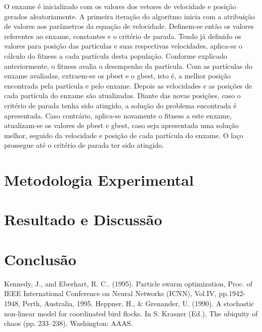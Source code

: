 \documentclass[conference]{IEEEtran}
\begin{document}
	O enxame é inicializado com os valores dos vetores de velocidade e posição gerados aleatoriamente. A primeira iteração do algoritmo inicia com a atribuição de valores aos parâmetros da equação de velocidade. Definem-se então os valores referentes ao enxame, constantes e o critério de parada. Tendo já definido os valores para posição das partículas e suas respectivas velocidades, aplica-se o cálculo do fitness a cada partícula desta população. Conforme explicado anteriormente, o fitness avalia o desempenho da partícula. Com as partículas do enxame avaliadas, extraem-se os pbest e o gbest, isto é, a melhor posição encontrada pela partícula e pelo enxame. Depois as velocidades e as posições de cada partícula do enxame são atualizadas. Diante das novas posições, caso o critério de parada tenha sido atingido, a solução do problema encontrada é apresentada. Caso contrário, aplica-se novamente o fitness a este enxame, atualizam-se os valores de pbest e gbest, caso seja apresentada uma solução melhor, seguido da velocidade e posição de cada partícula do enxame. O laço prossegue até o critério de parada ter sido atingido.
    
\section{Metodologia Experimental}



\section{Resultado e Discussão}



\section*{Conclusão}




\begin{thebibliography}{00}

 Kennedy, J., and Eberhart, R. C.. (1995). Particle swarm optimization, Proc. of IEEE International Conference on Neural Networks (ICNN), Vol.IV, pp.1942-1948, Perth, Australia, 1995.
 Heppner, H., \& Grenander, U. (1990). A stochastic non-linear model for coordinated bird flocks. In S. Krasner
(Ed.), The ubiquity of chaos (pp. 233–238). Washington: AAAS.
\end{thebibliography}
\vspace{12pt}
\end{document}
